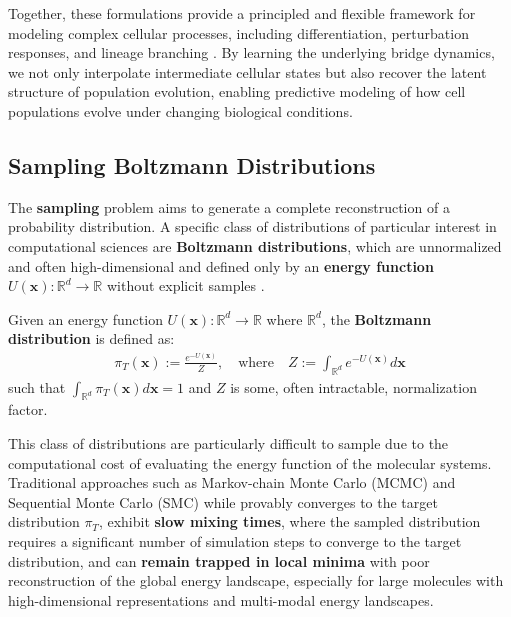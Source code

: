 \documentclass{article}
\newcommand{\boldtext}[1]{\textbf{\textcolor{MyGreen}{#1}}}
\begin{document}
Together, these formulations provide a principled and flexible framework for modeling complex cellular processes, including differentiation, perturbation responses, and lineage branching \citep{zhang2024learning, zhang2025modeling, tang2026branchsbm}. By learning the underlying bridge dynamics, we not only interpolate intermediate cellular states but also recover the latent structure of population evolution, enabling predictive modeling of how cell populations evolve under changing biological conditions.

\subsection{Sampling Boltzmann Distributions}
\label{subsec:sampling}
The \textbf{sampling} problem aims to generate a complete reconstruction of a probability distribution. A specific class of distributions of particular interest in computational sciences are \boldtext{Boltzmann distributions}, which are unnormalized and often high-dimensional and defined only by an \textbf{energy function} $U(\boldsymbol{x}):\mathbb{R}^d\to \mathbb{R}$ without explicit samples \citep{binder1992monte, tuckerman2023statistical, yang2019enhanced}.  

\begin{definition}\label{problem:boltzmann}
    Given an energy function $U(\boldsymbol{x}): \mathbb{R}^d\to \mathbb{R}$ where $\mathbb{R}^d$, the \textbf{Boltzmann distribution} is defined as:
    \begin{align}
        \pi_T(\boldsymbol{x}):=\frac{e^{-U(\boldsymbol{x})}}{Z}, \quad \text{where}\quad Z:=\int_{\mathbb{R}^d}e^{-U(\boldsymbol{x})}d\boldsymbol{x}
    \end{align}
    such that $\int_{\mathbb{R}^d}\pi_T(\boldsymbol{x})d\boldsymbol{x}=1$ and $Z$ is some, often intractable, normalization factor.
\end{definition}

This class of distributions are particularly difficult to sample due to the computational cost of evaluating the energy function of the molecular systems. Traditional approaches such as Markov-chain Monte Carlo (MCMC) \citep{metropolis1953equation, neal2001annealed} and Sequential Monte Carlo (SMC) \citep{doucet2001introduction} while provably converges to the target distribution $\pi_T$, exhibit \textbf{slow mixing times}, where the sampled distribution requires a significant number of simulation steps to converge to the target distribution, and can \textbf{remain trapped in local minima} with poor reconstruction of the global energy landscape, especially for large molecules with high-dimensional representations and multi-modal energy landscapes.
\end{document}
